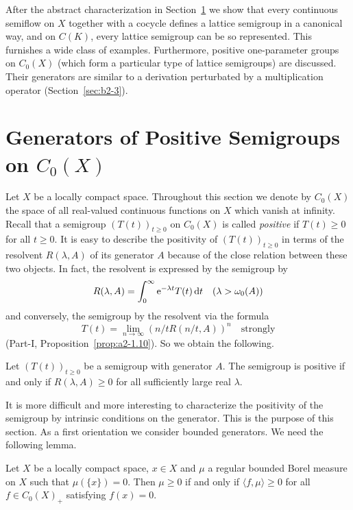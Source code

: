 After the abstract characterization in Section~\ref{sec:b2-1} we show that every continuous semiflow on $X$ together with a cocycle defines a lattice semigroup in a canonical way, and on $C(K)$, every lattice semigroup can be so represented.
This furnishes a wide class of examples.
Furthermore, positive one-parameter groups on $C_{0}(X)$ (which form a particular type of lattice semigroups) are discussed.
Their generators are similar to a derivation perturbated by a multiplication operator (Section~\ref{sec:b2-3}).

\section{Generators of Positive Semigroups on  \texorpdfstring{$C_{0}(X)$}{C_0(X)}} \label{sec:b2-1}%
Let $X$ be a locally compact space.
Throughout this section we denote by $C_{0}(X)$ the space of all real-valued continuous functions on $X$ which vanish at infinity.
Recall that a semigroup $(T(t))_{t \geq 0}$ on $C_{0}(X)$ is called \emph{positive} if\/ $T(t) \geq 0$ for all $t \geq 0$.
It is easy to describe the positivity of\/ $(T(t))_{t \geq 0}$ in terms of the resolvent $R(\lambda,A)$ of its generator $A$ because of the close relation between these two objects.
In fact, the resolvent is expressed by the semigroup by
\begin{equation}\label{eq:b2-1.1}
R(\lambda,A) = \int_{0}^{\infty} \mathrm{e}^{-\lambda t} T(t) \mathop{}\!\mathrm{d}{t} \quad (\lambda > \omega_{0}(A))
\end{equation}
and conversely, the semigroup by the resolvent via the formula
\begin{equation}\label{eq:b2-1.2}
T(t) = \lim_{n \to \infty} (n/tR(n/t,A))^{n} \quad \text{strongly}
\end{equation}
(\cf Part-I, Proposition~\ref{prop:a2-1.10}).
So we obtain the following.
\begin{proposition}\label{prop:b2-1.1}%
Let $(T(t))_{t \geq 0}$ be a semigroup with generator $A$.
The semigroup is positive if and only if\/ $R(\lambda,A) \geq 0$ for all sufficiently large real $\lambda$.
\end{proposition}
It is more difficult and more interesting to characterize the positivity of the semigroup by intrinsic conditions on the generator.
This is the purpose of this section.
As a first orientation we consider bounded generators.
We need the following lemma.
\begin{lemma}\label{lem:b2-1.2}
Let $X$ be a locally compact space, $x \in X$ and $\mu$ a regular bounded Borel measure on $X$ such that $\mu(\{x\}) = 0$.
Then $\mu \geq 0$ if and only if\/ $\langle f,\mu \rangle \geq 0$ for all $f \in C_{0}(X)_{+}$ satisfying $f(x) = 0$.
\end{lemma}
